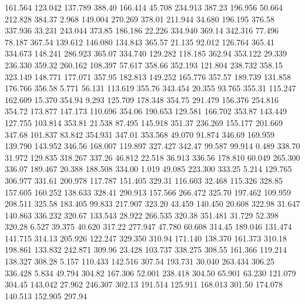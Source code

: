  161.564  123.042  137.789       388.40
 166.414   45.708  234.913       387.23
 196.956   50.664  212.828       384.37
   2.968  149.004  270.269       378.01
 211.944   34.680  196.195       376.58
 337.936   33.231  243.044       373.85
 186.186   22.226  334.940       369.14
 342.316   77.496   78.187       367.54
 139.612  146.080  134.843       365.57
  21.135   92.012  126.764       365.41
 334.673  148.241  286.923       365.07
 334.740  129.282  118.185       362.94
 353.122   29.339  236.330       359.32
 260.162  108.397   57.617       358.66
 352.193  121.804  238.732       358.15
 323.149  148.771  177.071       357.95
 182.813  149.252  165.776       357.57
 189.739  131.858  176.766       356.58
   5.771   56.131  113.619       355.76
 343.454   20.355   93.765       355.31
 115.247  162.609   15.370       354.94
   9.293  125.709  178.348       354.75
 291.479  156.376  254.816       354.72
 173.877  147.173  110.696       354.06
 190.653  129.581  166.702       353.87
 143.449  127.755  103.814       353.81
  21.538   87.495  145.918       351.37
 236.269  155.177  201.669       347.68
 101.837   83.842  354.931       347.01
 353.568   49.070   91.874       346.69
 169.959  139.790  143.952       346.56
 168.007  119.897  327.427       342.47
  99.587   99.914    0.489       338.70
  31.972  129.835  318.267       337.26
  46.812   22.518   36.913       336.56
 178.810   60.049  265.300       336.07
 189.467   20.388  188.508       334.00
   1.019   49.085  223.300       333.25
   5.214  129.765  306.977       331.61
 200.978  117.787  151.405       329.31
 116.603   32.468  115.326       328.85
 157.605  160.252  138.633       328.41
 290.913  157.566  266.472       325.70
 197.462  109.959  208.511       325.58
 183.405   99.833  217.907       323.20
  43.459  140.450   20.608       322.98
  31.647  140.863  336.232       320.67
 133.543   28.922  266.535       320.38
 351.481   31.729   52.398       320.28
   6.527   39.375   40.620       317.22
 277.947   47.780   60.608       314.45
 189.046  131.474  141.715       314.13
 205.926  122.247  329.350       310.94
 171.140  138.370  161.373       310.18
 198.861  133.832  242.871       309.96
  23.428  103.737  338.275       308.55
 161.366  119.214  138.327       308.28
   5.157  110.433  142.516       307.54
 193.731   30.040  263.434       306.25
 336.428    5.834   49.794       304.82
 167.306   52.001  238.418       304.50
  65.901   63.230  121.079       304.45
 143.042   27.962  246.307       302.13
 191.514  125.911  168.013       301.50
 174.078  140.513  152.905       297.94

